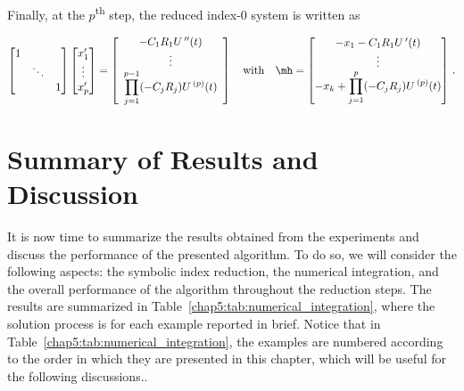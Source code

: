 %
Finally, at the $p$\textsuperscript{th} step, the reduced index-0 system is written as
%
\begin{small}
  \begin{equation*}
    \begin{bmatrix}
      1 & & \\
      & \ddots & \\
      & & 1 \\
    \end{bmatrix}
    \begin{bmatrix}
      x_1^{\prime} \\ \vdots \\ x_p^{\prime}
    \end{bmatrix} = \left[\begin{array}{c}
      -C_1 R_1 U{\,}^{\prime\prime}(t) \\
      \vdots \\
      \displaystyle\prod_{j=1}^{p-1} (-C_j R_j) U{\,}^{(p)}(t)
    \end{array}\right]
    \quad \text{with} \quad
    \mh = \begin{bmatrix}
      -x_{1} - C_1 R_1 U{\,}^{\prime}(t) \\
      \vdots \\
      -x_k + \displaystyle\prod_{j=1}^{p} (-C_j R_j) U{\,}^{(p)}(t)
    \end{bmatrix} \, \text{.}
  \end{equation*}
\end{small}


\section{Summary of Results and Discussion}

It is now time to summarize the results obtained from the experiments and discuss the performance of the presented algorithm. To do so, we will consider the following aspects: the symbolic index reduction, the numerical integration, and the overall performance of the algorithm throughout the reduction steps. The results are summarized in Table~\ref{chap5:tab:numerical_integration}, where the solution process is for each example reported in brief. Notice that in Table~\ref{chap5:tab:numerical_integration}, the examples are numbered according to the order in which they are presented in this chapter, which will be useful for the following discussions..

